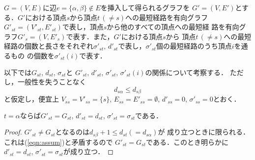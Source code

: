 $G=(V,E)$に辺$e=\{\alpha,\beta\} \not\in E$を挿入して得られるグラフを
$G'=(V,E')$とする．$G'$における頂点$s$から頂点$t\,(\neq s)$への最短経路を有向グラフ
$G'_{st}=(V'_{st},E'_{st})$で表し，頂点$s$から他のすべての頂点への最短経
路を有向グラフ$G'_s=(V,E'_s)$で表す．また，$G'$における頂点$s$から
頂点$t\,(\neq s)$への最短経路の個数と長さをそれぞれ$\sigma'_{st}$, 
$d'_{st}$で表し，$\sigma'_{st}$個の最短経路のうち頂点$i$を通るもの
の個数を$\sigma'_{st}(i)$で表す．

以下では$G_{st}$, $d_{st}$, $\sigma_{st}$と
$G'_{st}$, $d'_{st}$, $\sigma'_{st}$, $\sigma'_{st}(i)$の関係について考察する．
ただし，一般性を失うことなく
\begin{equation}
d_{s\alpha} \leq d_{s\beta}
\label{eqn:assum}
\end{equation}
と仮定し，便宜上
$V_{ss}=V'_{ss}=\{s\}$, $E_{ss}=E'_{ss}=\emptyset$, $d'_{ss}=0$, 
$\sigma'_{ss}=0$とおく．

\begin{lemma}
\rm 
$t=\alpha$ならば$G'_{st}=G_{st}$, $d'_{st}=d_{st}$, 
$\sigma'_{st}=\sigma_{st}$である．
\label{lemma:5}
\end{lemma}
\begin{proof}
$G'_{st} \neq G_{st}$となるのは$d_{s\beta}+1 \leq d_{st}(=d_{s\alpha})$が
成り立つときに限られる．これは(\ref{eqn:assum})と矛盾するので
$G'_{st}=G_{st}$である．このとき明らかに$d'_{st}=d_{st}$, 
$\sigma'_{st}=\sigma_{st}$が成り立つ．
\end{proof}


